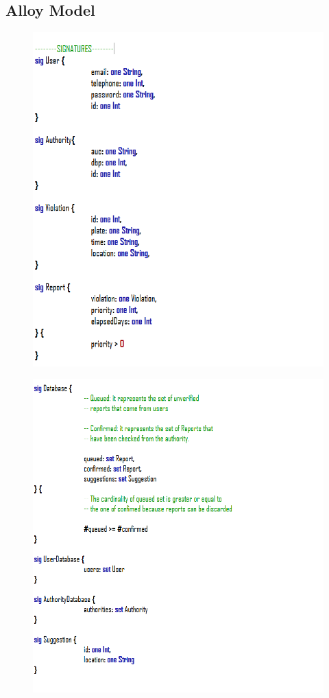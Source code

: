 \documentclass[12pt,a4paper]{article}
\begin{document}
\subsection{Alloy Model}
\begin{figure}[H]
				\centering
				\includegraphics[width=1\linewidth]{../assets/images/exports/user/Sig1.png}
				\label{fig:signatures}
			\end{figure}
\begin{figure}[H]
				\centering
				\includegraphics[width=1\linewidth]{../assets/images/exports/user/Sig2.png}
				\label{fig:signatures}
			\end{figure}
\end{document}

